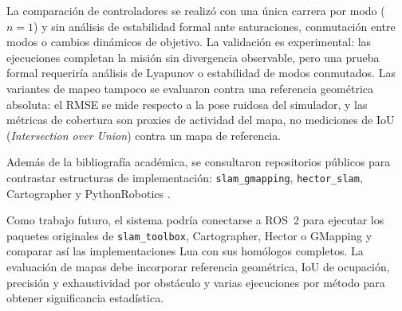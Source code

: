 La comparación de controladores se realizó con una única carrera por modo
(\(n=1\)) y sin análisis de estabilidad formal ante saturaciones, conmutación
entre modos o cambios dinámicos de objetivo. La validación es experimental:
las ejecuciones completan la misión sin divergencia observable, pero una
prueba formal requeriría análisis de Lyapunov o estabilidad de modos conmutados.
Las variantes de mapeo tampoco se evaluaron contra una referencia geométrica
absoluta: el RMSE se mide respecto a la pose ruidosa del simulador, y las métricas
de cobertura son proxies de actividad del mapa, no mediciones de IoU (\textit{Intersection
over Union}) contra un mapa de referencia.

Además de la bibliografía académica, se consultaron repositorios públicos para
contrastar estructuras de implementación: \texttt{slam\_gmapping},
\texttt{hector\_slam}, Cartographer y PythonRobotics
\cite{githubSlamGmapping,githubHectorSlam,githubCartographer,pythonRobotics}.

Como trabajo futuro, el sistema podría conectarse a ROS~2 para ejecutar los
paquetes originales de \texttt{slam\_toolbox}, Cartographer, Hector o
GMapping y comparar así las implementaciones Lua con sus homólogos completos. La evaluación de mapas debe incorporar referencia
geométrica, IoU de ocupación, precisión y exhaustividad por obstáculo y
varias ejecuciones por método para obtener significancia estadística.
